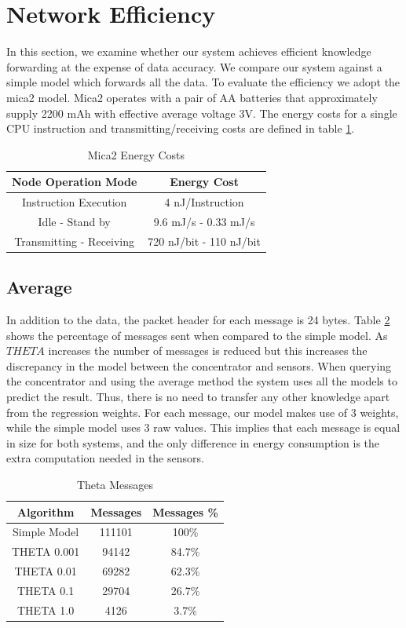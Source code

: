 \documentclass{mproj}
\begin{document}
\section{Network Efficiency}
\label{sec:networkefficiency}
In this section, we examine whether our system achieves efficient knowledge forwarding at the expense of data accuracy. We compare our system against a simple model which forwards all the data. To evaluate the efficiency we adopt the mica2 \cite{mica2} model. Mica2 operates with a pair of AA batteries that approximately supply 2200 mAh with effective average voltage 3V. The energy costs for a single CPU instruction and transmitting/receiving costs are defined in table \ref{table:energy}.

 \begin{table}[!ht]
 \centering
 \begin{tabular}{||c | c||}
 \hline
 Node Operation Mode & Energy Cost \\
 \hline\hline
 Instruction Execution & 4 nJ/Instruction \\ 
 \hline
 Idle - Stand by & 9.6 mJ/s - 0.33 mJ/s\\
 \hline
 Transmitting - Receiving & 720 nJ/bit - 110 nJ/bit\\
 \hline
\end{tabular}
\caption{Mica2 Energy Costs}
 \label{table:energy} 
\end{table}

\subsection{Average}
In addition to the data, the packet header for each message is 24 bytes. Table \ref{table:thetaMessages} shows the percentage of messages sent when compared to the simple model. As $THETA$ increases the number of messages is reduced but this increases the discrepancy in the model between the concentrator and sensors. When querying the concentrator and using the average method the system uses all the models to predict the result. Thus, there is no need to transfer any other knowledge apart from the regression weights. For each message, our model makes use of 3 weights, while the simple model uses 3 raw values. This implies that each message is equal in size for both systems, and the only difference in energy consumption is the extra computation needed in the sensors.

\begin{table}[!ht]
 \centering
 \begin{tabular}{||c | c | c||}
 \hline
 Algorithm & Messages & Messages \%\\
 \hline\hline
 Simple Model & 111101 & 100\%\\ 
 \hline
 THETA 0.001 & 94142 & 84.7\%\\
 \hline
 THETA 0.01 & 69282 & 62.3\%\\
 \hline
 THETA 0.1 & 29704 & 26.7\%\\
 \hline
 THETA 1.0 & 4126 & 3.7\%\\
 \hline
\end{tabular}
\caption{Theta Messages}
 \label{table:thetaMessages} 
\end{table}
\end{document}
